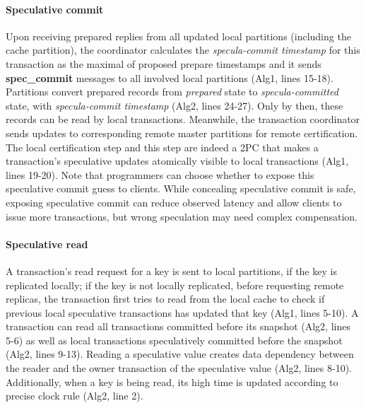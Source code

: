 \paragraph{Speculative commit} Upon receiving prepared replies from all updated local partitions (including the cache partition), the coordinator calculates the \textit{specula-commit timestamp} for this transaction as the maximal of proposed prepare timestamps and it sends \textbf{spec\_commit} messages to all involved local partitions (Alg1, lines 15-18). Partitions convert prepared records from \textit{prepared} state to \textit{specula-committed} state, with \textit{specula-commit timestamp} (Alg2, lines 24-27). Only by then, these records can be read by local transactions. Meanwhile, the transaction coordinator sends updates to corresponding remote master partitions for remote certification. The local certification step and this step are indeed a 2PC that makes a transaction's speculative updates atomically visible to local transactions (Alg1, lines 19-20). Note that programmers can choose whether to expose this speculative commit guess to clients. While concealing speculative commit is safe, exposing speculative commit can reduce observed latency and allow clients to issue more transactions, but wrong speculation may need complex compensation.

\paragraph{Speculative read}  A transaction's read request for a key is sent to local partitions, if the key is replicated locally; if the key is not locally replicated, before requesting remote replicas, the transaction first tries to read from the local cache to check if previous local speculative transactions has updated that key (Alg1, lines 5-10). A transaction can read all transactions committed before its snapshot (Alg2, lines 5-6) as well as local transactions speculatively committed before the snapshot (Alg2, lines 9-13). Reading a speculative value creates data dependency between the reader and the owner transaction of the speculative value (Alg2, lines 8-10). Additionally, when a key is being read, its high time is updated according to precise clock rule (Alg2, line 2).

